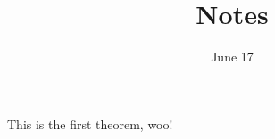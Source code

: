 \documentclass[12pt]{scrartcl}
\title{Notes}
\date{June 17}
\begin{document}
\maketitle

\pagebreak

\begin{theorem}
    This is the first theorem, woo!
\end{theorem}
\end{document}
